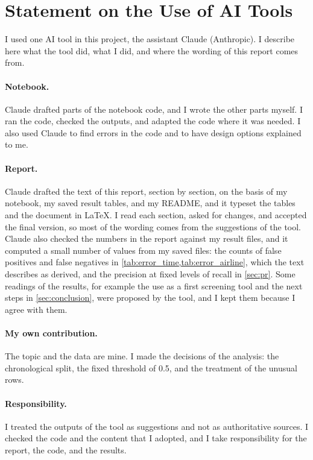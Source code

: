 \section*{Statement on the Use of AI Tools}

I used one AI tool in this project, the assistant Claude (Anthropic). I describe here what the tool did, what I did, and where the wording of this report comes from.

\paragraph{Notebook.} Claude drafted parts of the notebook code, and I wrote the other parts myself. I ran the code, checked the outputs, and adapted the code where it was needed. I also used Claude to find errors in the code and to have design options explained to me.

\paragraph{Report.} Claude drafted the text of this report, section by section, on the basis of my notebook, my saved result tables, and my README, and it typeset the tables and the document in LaTeX. I read each section, asked for changes, and accepted the final version, so most of the wording comes from the suggestions of the tool. Claude also checked the numbers in the report against my result files, and it computed a small number of values from my saved files: the counts of false positives and false negatives in \cref{tab:error_time,tab:error_airline}, which the text describes as derived, and the precision at fixed levels of recall in \cref{sec:pr}. Some readings of the results, for example the use as a first screening tool and the next steps in \cref{sec:conclusion}, were proposed by the tool, and I kept them because I agree with them.

\paragraph{My own contribution.} The topic and the data are mine. I made the decisions of the analysis: the chronological split, the fixed threshold of 0.5, and the treatment of the unusual rows.

\paragraph{Responsibility.} I treated the outputs of the tool as suggestions and not as authoritative sources. I checked the code and the content that I adopted, and I take responsibility for the report, the code, and the results.
